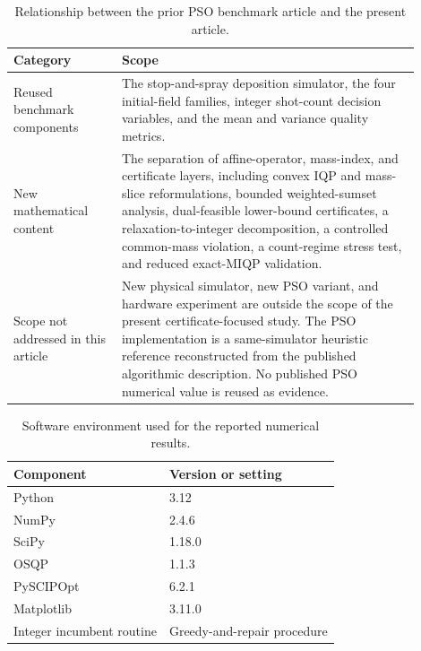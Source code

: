 \begin{table}[h]
\centering
\caption{Relationship between the prior PSO benchmark article and the present article.}
\label{tab:prior-relation-si}
\begin{tabular}{p{0.24\linewidth}p{0.66\linewidth}}
\toprule
Category & Scope \\
\midrule
Reused benchmark components & The stop-and-spray deposition simulator, the four
initial-field families, integer shot-count decision variables, and the
mean and variance quality metrics. \\
New mathematical content & The separation of affine-operator, mass-index, and
certificate layers, including convex IQP and mass-slice reformulations, bounded
weighted-sumset analysis, dual-feasible lower-bound certificates, a
relaxation-to-integer decomposition, a controlled common-mass violation, a
count-regime stress test, and reduced exact-MIQP validation. \\
Scope not addressed in this article & New physical simulator, new PSO variant,
and hardware experiment are outside the scope of the present certificate-focused
study. The PSO implementation is a same-simulator heuristic reference
reconstructed from the published algorithmic description. No published PSO
numerical value is reused as evidence. \\
\bottomrule
\end{tabular}
\end{table}

\begin{table}[h]
\centering
\caption{Software environment used for the reported numerical results.}
\label{tab:software-si}
\begin{tabular}{ll}
\toprule
Component & Version or setting \\
\midrule
Python & 3.12 \\
NumPy & 2.4.6 \\
SciPy & 1.18.0 \\
OSQP & 1.1.3 \\
PySCIPOpt & 6.2.1 \\
Matplotlib & 3.11.0 \\
Integer incumbent routine & Greedy-and-repair procedure \\
\bottomrule
\end{tabular}
\end{table}

